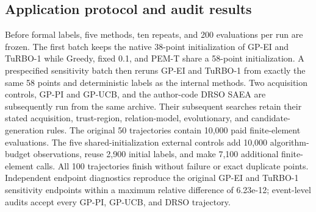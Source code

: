\documentclass[]{interact}
\begin{document}
\hypertarget{application-protocol-and-audit-results}{%
\subsection{Application protocol and audit results}\label{application-protocol-and-audit-results}}

Before formal labels, five methods, ten repeats, and 200 evaluations per run are frozen. The first batch keeps the native 38-point initialization of GP-EI and TuRBO-1 while Greedy, fixed 0.1, and PEM-T share a 58-point initialization. A prespecified sensitivity batch then reruns GP-EI and TuRBO-1 from exactly the same 58 points and deterministic labels as the internal methods. Two acquisition controls, GP-PI and GP-UCB, and the author-code DRSO SAEA are subsequently run from the same archive. Their subsequent searches retain their stated acquisition, trust-region, relation-model, evolutionary, and candidate-generation rules. The original 50 trajectories contain 10,000 paid finite-element evaluations. The five shared-initialization external controls add 10,000 algorithm-budget observations, reuse 2,900 initial labels, and make 7,100 additional finite-element calls. All 100 trajectories finish without failure or exact duplicate points. Independent endpoint diagnostics reproduce the original GP-EI and TuRBO-1 sensitivity endpoints within a maximum relative difference of 6.23e-12; event-level audits accept every GP-PI, GP-UCB, and DRSO trajectory.

\FloatBarrier\begingroup\fontsize{8.5}{10.5}\selectfont\setlength\tabcolsep{3pt}
\end{document}
